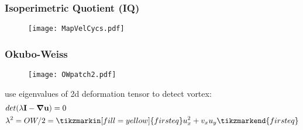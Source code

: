 \begin{frame}
 \frametitle{Isoperimetric Quotient (IQ)}
\begin{figure}
	\centering
	\texttt{[image: MapVelCycs.pdf]}
\end{figure}
\end{frame}
\begin{frame}
	\frametitle{Okubo-Weiss}
	\centering
	\begin{minipage}[T]{1\textwidth}
	\begin{figure}
		\texttt{[image: OWpatch2.pdf]}
	\end{figure}		
	\end{minipage}
\vfill
	\begin{minipage}[T]{1\textwidth}
		use eigenvalues of 2d deformation tensor to detect vortex: 
\begin{align*}
& det(\lambda\vec{I}- \vec{\grad \vec{u}}) =0\\
&\lambda^{2} =OW/2=\tikzmarkin[fill=yellow]{first eq}u_{x}^{2} + v_{x}u_{y}\tikzmarkend{first eq} \\
\end{align*}		
\end{minipage}
\end{frame}



